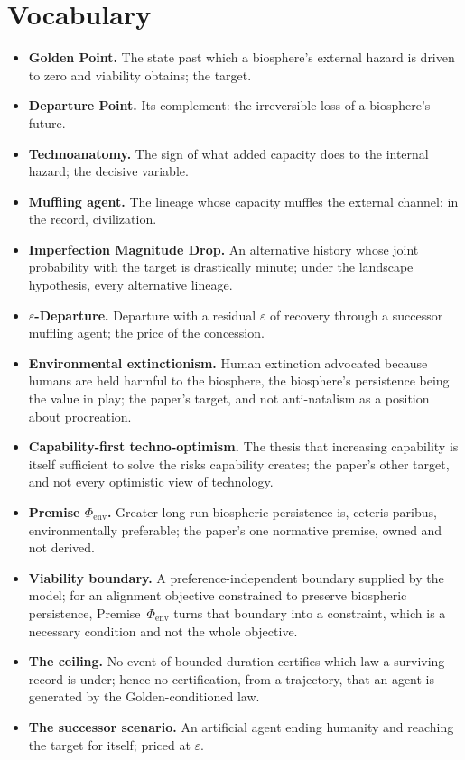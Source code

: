 \section{Vocabulary}\label{sec:vocab}
\begin{itemize}[itemsep=2pt]
\item \textbf{Golden Point.} The state past which a biosphere's external
hazard is driven to zero and viability obtains; the target.
\item \textbf{Departure Point.} Its complement: the irreversible loss of a
biosphere's future.
\item \textbf{Technoanatomy.} The sign of what added capacity does to the
internal hazard; the decisive variable.
\item \textbf{Muffling agent.} The lineage whose capacity muffles the
external channel; in the record, civilization.
\item \textbf{Imperfection Magnitude Drop.} An alternative history whose
joint probability with the target is drastically minute; under the
landscape hypothesis, every alternative lineage.
\item \textbf{$\varepsilon$-Departure.} Departure with a residual
$\varepsilon$ of recovery through a successor muffling agent; the price
of the concession.
\item \textbf{Environmental extinctionism.} Human extinction advocated
because humans are held harmful to the biosphere, the biosphere's
persistence being the value in play; the paper's target, and not
anti-natalism as a position about procreation.
\item \textbf{Capability-first techno-optimism.} The thesis that
increasing capability is itself sufficient to solve the risks
capability creates; the paper's other target, and not every optimistic
view of technology.
\item \textbf{Premise $\Phi_{\mathrm{env}}$.} Greater long-run
biospheric persistence is, ceteris paribus, environmentally preferable;
the paper's one normative premise, owned and not derived.
\item \textbf{Viability boundary.} A preference-independent boundary
supplied by the model; for an alignment objective constrained to
preserve biospheric persistence, Premise~$\Phi_{\mathrm{env}}$ turns
that boundary into a constraint, which is a necessary condition and not
the whole objective.
\item \textbf{The ceiling.} No event of bounded duration certifies which
law a surviving record is under; hence no certification, from a
trajectory, that an agent is generated by the Golden-conditioned law.
\item \textbf{The successor scenario.} An artificial agent ending
humanity and reaching the target for itself; priced at $\varepsilon$.
\end{itemize}

